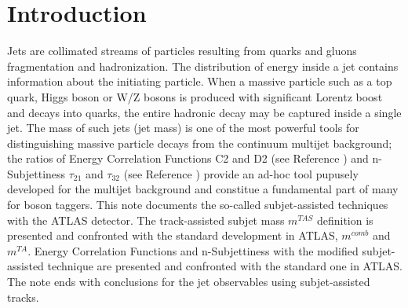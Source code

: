 \documentclass[UKenglish,texlive=2013]{\ATLASLATEXPATH atlasdoc}
\begin{document}
\maketitle

\tableofcontents


\section{Introduction}
\label{sec:intro}



Jets are collimated streams of particles resulting from quarks and gluons fragmentation and hadronization.
The distribution of energy inside a jet contains information about the initiating particle. When a massive
particle such as a top quark, Higgs boson or W/Z bosons is produced with significant Lorentz boost and decays into
quarks, the entire hadronic decay may be captured inside a single jet. The mass of such jets (jet mass)
is one of the most powerful tools for distinguishing massive particle decays from the continuum multijet
background; the ratios of Energy Correlation Functions C2 and D2 (see Reference \cite{bib:ECF}) and n-Subjettiness $\tau_{21}$ and $\tau_{32}$ (see Reference \cite{bib:nsub}) provide an ad-hoc tool pupusely developed for the multijet background and constitue a fundamental part of many for boson taggers.
This note documents the so-called subjet-assisted techniques with the ATLAS detector. 
The track-assisted subjet mass $m^{TAS}$ definition is presented and confronted with the standard development in ATLAS, $m^{comb}$ and $m^{TA}$. 
Energy Correlation Functions and n-Subjettiness with the modified subjet-assisted technique are presented and confronted with the standard one in ATLAS.
The note ends with conclusions for the jet observables using subjet-assisted tracks.


\end{document}
